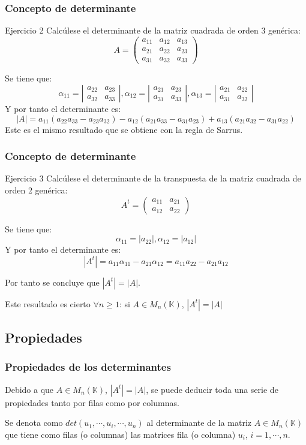 \documentclass[12pt]{article}
\begin{document}
         \begin{frame}
  \frametitle{Concepto de determinante}
   \begin{block}{Ejercicio 2}
Calc\'ulese el determinante de la matriz cuadrada de orden 3 gen\'erica:
\[A=  \left(\begin{array}{ccc}a_{11}&a_{12}&a_{13} \\a_{21}&a_{22}&a_{23} \\a_{31}&a_{32}&a_{33} \end{array}\right) \]
\end{block}
Se tiene que:
\[\alpha_{11} = \left|\begin{array}{cc}a_{22} & a_{23}\\a_{32} & a_{33} \end{array}\right|, 
\alpha_{12} = \left|\begin{array}{cc}a_{21} & a_{23}\\a_{31} & a_{33} \end{array}\right|,
\alpha_{13} = \left|\begin{array}{cc}a_{21} & a_{22}\\a_{31} & a_{32} \end{array}\right|\]
Y por tanto el determinante es:
\[|A| = a_{11}(a_{22}a_{33}-a_{23}a_{32})-a_{12}(a_{21}a_{33}-a_{31}a_{23})+a_{13}(a_{21}a_{32}-a_{31}a_{22})\]
Este es el mismo resultado que se obtiene con la regla de Sarrus.
  \end{frame} 
  
           \begin{frame}
  \frametitle{Concepto de determinante}
   \begin{block}{Ejercicio 3}
Calc\'ulese el determinante de la transpuesta de la matriz cuadrada de orden 2 gen\'erica:
\[A^t=  \left(\begin{array}{cc}a_{11}&a_{21} \\a_{12}&a_{22} \end{array}\right) \]
\end{block}
Se tiene que:
\[\alpha_{11} =|a_{22}|, \alpha_{12} =|a_{12}|\]
Y por tanto el determinante es:
\[|A^t| = a_{11}\alpha_{11}-a_{21}\alpha_{12} = a_{11}a_{22}-a_{21}a_{12}\]

Por tanto se concluye que $|A^t| = |A|$.

Este resultado es cierto $\forall n\geq 1$: si $A\in M_n(\mathbb{K})$, $|A^t| = |A|$
  \end{frame} 
  
    \subsection{Propiedades}
           \begin{frame}
  \frametitle{Propiedades de los determinantes}
 Debido a que $A\in M_n(\mathbb{K})$, $|A^t| = |A|$, se puede deducir toda una serie de propiedades tanto por filas como por columnas.
 
 Se denota como $det(u_1,\cdots, u_i,\cdots, u_n)$ al determinante de la matriz $A\in M_n(\mathbb{K})$ que tiene como filas (o columnas) las matrices fila (o columna) $u_i$, $i=1,\cdots, n$.

    \end{frame} 
  
\end{document}
